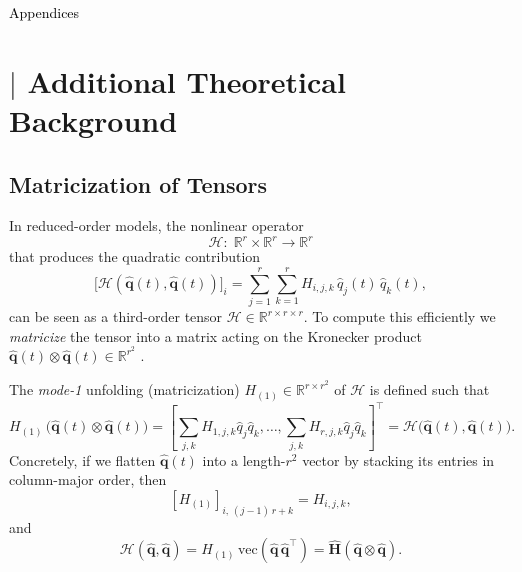 \begin{center}
    \thispagestyle{empty}
        
    \vspace*{\fill}
    
        {\LARGE\fontsize{26}{26}\selectfont\textcolor{black}{Appendices}\par}
        
    \vspace*{\fill}
\end{center}

\newpage


\chapter{$\vert$ Additional Theoretical Background}
\label{chap:appa}


\section*{Matricization of Tensors}
\label{sec:tensor_matricization}


In reduced-order models, the nonlinear operator\\
$$\mathcal{H}:\;\mathbb{R}^r\times\mathbb{R}^r\to\mathbb{R}^r$$
that produces the quadratic contribution\\
$$\bigl[\mathcal{H}(\hat{\mathbf{q}}(t),\hat{\mathbf{q}}(t))\bigr]_i
=\sum_{j=1}^r\sum_{k=1}^r H_{i,j,k}\,\hat{q}_j(t)\,\hat{q}_k(t),$$
can be seen as a third-order tensor $\mathcal{H}\in\mathbb{R}^{r\times r\times r}$.  To compute this efficiently we \emph{matricize} the tensor into a matrix acting on the Kronecker product $\hat{\mathbf{q}}(t)\otimes\hat{\mathbf{q}}(t)\in\mathbb{R}^{r^2}$ \cite{kolda2009tensor}.  

The \emph{mode-1} unfolding (matricization) $H_{(1)}\in\mathbb{R}^{r\times r^2}$ of $\mathcal{H}$ is defined such that\\
$$
H_{(1)}\,\bigl(\hat{\mathbf{q}}(t)\otimes\hat{\mathbf{q}}(t)\bigr)
= \left[\sum_{j,k}H_{1,j,k}\hat{q}_j\hat{q}_k,\dots,\sum_{j,k}H_{r,j,k}\hat{q}_j\hat{q}_k\right]^{\top}
= \mathcal{H}\bigl(\hat{\mathbf{q}}(t),\hat{\mathbf{q}}(t)\bigr).
$$
Concretely, if we flatten $\hat{\mathbf{q}}(t)$ into a length-$r^2$ vector by stacking its entries in column-major order, then
$$
[H_{(1)}]_{i,\, (j-1)\,r + k} = H_{i,j,k},
$$
and
$$
\mathcal{H}(\hat{\mathbf{q}},\hat{\mathbf{q}}) = H_{(1)}\,\mathrm{vec}(\hat{\mathbf{q}}\,\hat{\mathbf{q}}^{\top}) = \hat{\mathbf{H}}(\hat{\mathbf{q}}\otimes\hat{\mathbf{q}}).$$

